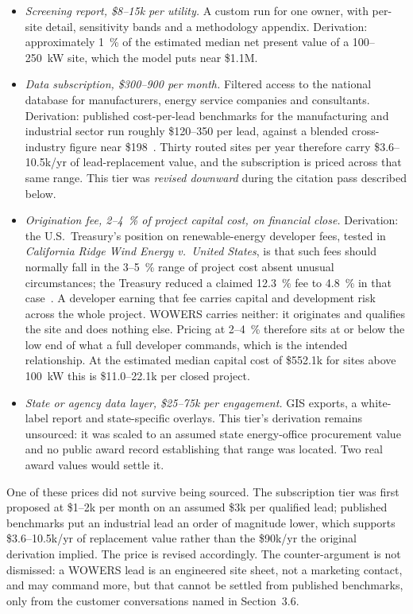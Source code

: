 \documentclass[12pt,letterpaper]{report}
\begin{document}
\begin{itemize}
  \item \emph{Screening report, \$8--15k per utility.} A custom run for one
    owner, with per-site detail, sensitivity bands and a methodology appendix.
    Derivation: approximately 1~\% of the estimated median net present value of a
    100--250~kW site, which the model puts near \$1.1M.
  \item \emph{Data subscription, \$300--900 per month.} Filtered access to the
    national database for manufacturers, energy service companies and consultants.
    Derivation: published cost-per-lead benchmarks for the manufacturing and
    industrial sector run roughly \$120--350 per lead, against a blended
    cross-industry figure near \$198~\cite{cpl_benchmark}. Thirty routed sites per
    year therefore carry \$3.6--10.5k/yr of lead-replacement value, and the
    subscription is priced across that same range. This tier was
    \emph{revised downward} during the citation pass described below.
  \item \emph{Origination fee, 2--4~\% of project capital cost, on financial
    close.} Derivation: the U.S.\ Treasury's position on renewable-energy developer
    fees, tested in \emph{California Ridge Wind Energy v.\ United States}, is that
    such fees should normally fall in the 3--5~\% range of project cost absent
    unusual circumstances; the Treasury reduced a claimed 12.3~\% fee to 4.8~\% in
    that case~\cite{nrf_devfees}. A developer earning that fee carries capital and
    development risk across the whole project. WOWERS carries neither: it originates
    and qualifies the site and does nothing else. Pricing at 2--4~\% therefore sits at
    or below the low end of what a full developer commands, which is the intended
    relationship. At the estimated median capital cost of \$552.1k for sites above
    100~kW this is \$11.0--22.1k per closed project.
  \item \emph{State or agency data layer, \$25--75k per engagement.} GIS exports, a
    white-label report and state-specific overlays. This tier's derivation remains
    unsourced: it was scaled to an assumed state energy-office procurement value and no
    public award record establishing that range was located. Two real award values
    would settle it.
\end{itemize}

One of these prices did not survive being sourced. The subscription tier was first
proposed at \$1--2k per month on an assumed \$3k per qualified lead; published
benchmarks put an industrial lead an order of magnitude lower, which supports
\$3.6--10.5k/yr of replacement value rather than the \$90k/yr the original derivation
implied. The price is revised accordingly. The counter-argument is not dismissed: a
WOWERS lead is an engineered site sheet, not a marketing contact, and may command
more, but that cannot be settled from published benchmarks, only from the customer
conversations named in Section~3.6.
\end{document}
